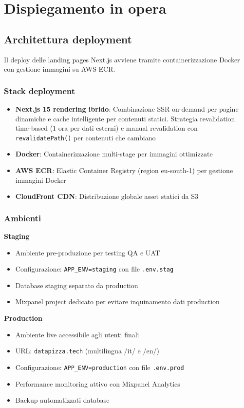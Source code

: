 \chapter{Dispiegamento in opera}

\section{Architettura deployment}
Il deploy delle landing pages Next.js avviene tramite containerizzazione Docker con gestione immagini su AWS ECR.

\subsection{Stack deployment}
\begin{itemize}
  \item \textbf{Next.js 15 rendering ibrido}: Combinazione SSR on-demand per pagine dinamiche e cache intelligente per contenuti statici. Strategia revalidation time-based (1 ora per dati esterni) e manual revalidation con \texttt{revalidatePath()} per contenuti che cambiano
  \item \textbf{Docker}: Containerizzazione multi-stage per immagini ottimizzate
  \item \textbf{AWS ECR}: Elastic Container Registry (region eu-south-1) per gestione immagini Docker
  \item \textbf{CloudFront CDN}: Distribuzione globale asset statici da S3
\end{itemize}

\subsection{Ambienti}
\textbf{Staging}
\begin{itemize}
  \item Ambiente pre-produzione per testing QA e UAT
  \item Configurazione: \texttt{APP\_ENV=staging} con file \texttt{.env.stag}
  \item Database staging separato da production
  \item Mixpanel project dedicato per evitare inquinamento dati production
\end{itemize}

\textbf{Production}
\begin{itemize}
  \item Ambiente live accessibile agli utenti finali
  \item URL: \texttt{datapizza.tech} (multilingua /it/ e /en/)
  \item Configurazione: \texttt{APP\_ENV=production} con file \texttt{.env.prod}
  \item Performance monitoring attivo con Mixpanel Analytics
  \item Backup automatizzati database
\end{itemize}

